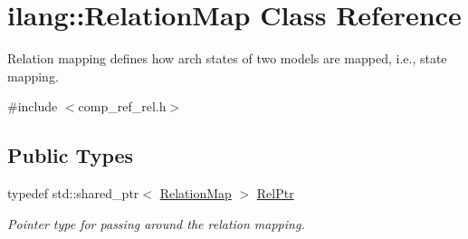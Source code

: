 \hypertarget{classilang_1_1_relation_map}{}\section{ilang\+:\+:Relation\+Map Class Reference}
\label{classilang_1_1_relation_map}


Relation mapping defines how arch states of two models are mapped, i.\+e., state mapping.  




{\ttfamily \#include $<$comp\+\_\+ref\+\_\+rel.\+h$>$}

\subsection*{Public Types}
\begin{DoxyCompactItemize}
\item 
\mbox{\label{classilang_1_1_relation_map_adfdefb173e77fc29073c233aa3ccdbd2}} 
typedef std\+::shared\+\_\+ptr$<$ \mbox{\hyperlink{classilang_1_1_relation_map}{Relation\+Map}} $>$ \mbox{\hyperlink{classilang_1_1_relation_map_adfdefb173e77fc29073c233aa3ccdbd2}{Rel\+Ptr}}
\begin{DoxyCompactList}\small\item\em Pointer type for passing around the relation mapping. \end{DoxyCompactList}\end{DoxyCompactItemize}
